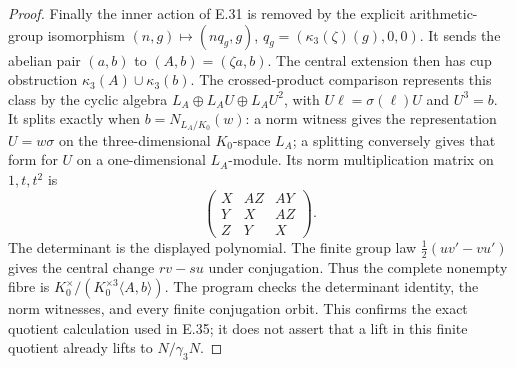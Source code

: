 \begin{proof}
Finally the inner action of E.31 is removed by the explicit
arithmetic-group isomorphism
$(n,g)\mapsto(nq_g,g)$, $q_g=(\kappa_3(\zeta)(g),0,0)$.
It sends the abelian pair $(a,b)$ to $(A,b)=(\zeta a,b)$.
The central extension then has cup obstruction
$\kappa_3(A)\cup\kappa_3(b)$. The crossed-product comparison \cite[IV.3.14]{MilneCFT} represents
this class by the cyclic algebra
$L_A\oplus L_AU\oplus L_AU^2$, with
$U\ell=\sigma(\ell)U$ and $U^3=b$. It splits exactly when
$b=N_{L_A/K_0}(w)$: a norm witness gives the representation
$U=w\sigma$ on the three-dimensional $K_0$-space $L_A$;
a splitting conversely gives that form for $U$ on a one-dimensional
$L_A$-module. Its norm multiplication matrix on $1,t,t^2$ is
\[
 \begin{pmatrix}X&AZ&AY\\Y&X&AZ\\Z&Y&X\end{pmatrix}.
\]
The determinant is the displayed polynomial. The finite group law
$\tfrac12(uv'-vu')$ gives the central change $rv-su$ under
conjugation. Thus the complete nonempty fibre is
$K_0^\times/(K_0^{\times3}\langle A,b\rangle)$.
The program checks the determinant identity, the norm witnesses,
and every finite conjugation orbit. This confirms the exact
quotient calculation used in E.35; it does not assert that a lift
in this finite quotient already lifts to $N/\gamma_3N$.
\end{proof}

